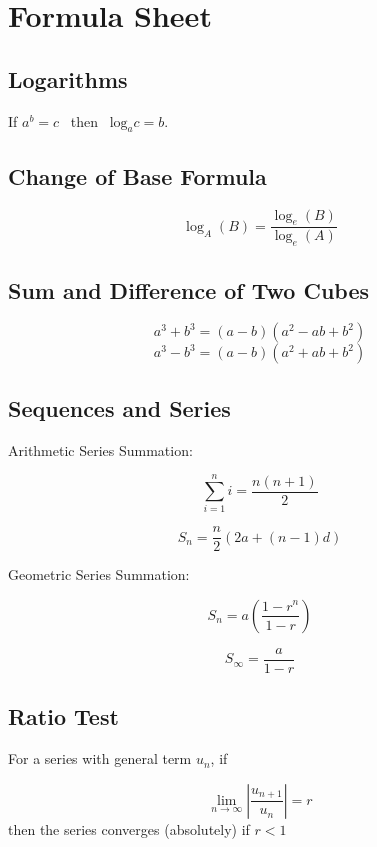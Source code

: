 \newpage
	\section*{Formula Sheet}
	
\subsection*{Logarithms}
If $a^b = c$ \, then \, $\mbox{log}_a c = b$.



\subsection*{Change of Base Formula}

\[ \log_A(B) = \frac{ \log_e(B) }{ \log_e(A) }  \]
	\subsection*{Sum and Difference of Two Cubes}
	\[ a^3 + b^3 = (a-b)(a^2 - ab + b^2)\]
	\[ a^3 - b^3 = (a-b)(a^2 + ab + b^2)\]
	
	
	\subsection*{Sequences and Series}
Arithmetic Series Summation:
\begin{multicols}{2}	
	\[ \sum_{i=1}^{n} i = \frac{n(n+1)}{2}\]
	

	\[ S_n = \frac{n}{2} \left(2a + (n-1) d \right)\]
\end{multicols}	
	Geometric Series Summation:
	\begin{multicols}{2}
	\[ S_n = a\left(\frac{1-r^n}{1-r}\right)\]
	
	\[ S_\infty = \frac{a}{1-r}\]
	\end{multicols}
	
	
	\subsection*{Ratio Test}
	
	For a series with general term $u_n$, if
	
	\[ \lim_{n \to \infty } \left| \frac{u_{n+1}}{u_n} \right| = r\]
	then the series converges (absolutely) if $r<1$
	
	
	
